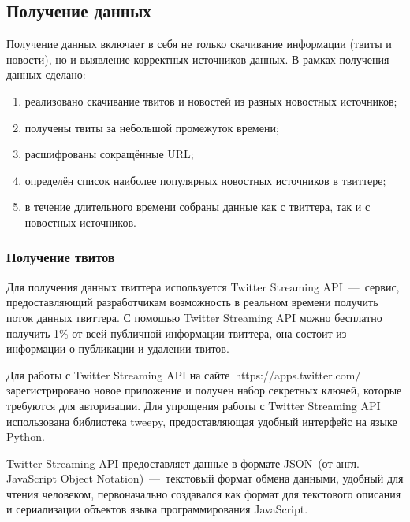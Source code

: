 \subsection{Получение данных}
    Получение данных включает в себя не только скачивание информации (твиты и новости), но и выявление корректных источников данных.
    В рамках получения данных сделано:
    \begin{enumerate}
        \item реализовано скачивание твитов и новостей из разных новостных источников;
        \item получены твиты за небольшой промежуток времени;
        \item расшифрованы сокращённые URL;
        \item определён список наиболее популярных новостных источников в твиттере;
        \item в течение длительного времени собраны данные как с твиттера, так и с новостных источников.
    \end{enumerate}

    \subsubsection{Получение твитов}
        Для получения данных твиттера используется Twitter Streaming API~---~сервис,
        предоставляющий разработчикам возможность в реальном времени получить поток данных твиттера.
        С помощью Twitter Streaming API можно бесплатно получить 1\% от всей публичной информации твиттера, она состоит из информации о публикации и удалении твитов.

        Для работы с Twitter Streaming API на сайте~https://apps.twitter.com/ зарегистрировано новое приложение и получен набор секретных ключей,
        которые требуются для авторизации.
        Для упрощения работы с Twitter Streaming API использована библиотека tweepy, предоставляющая удобный интерфейс на языке Python.

        Twitter Streaming API предоставляет данные в формате JSON~(от англ. JavaScript Object Notation)~---~текстовый формат обмена данными, удобный для чтения человеком,
        первоначально создавался как формат для текстового описания и сериализации объектов языка программирования JavaScript.

